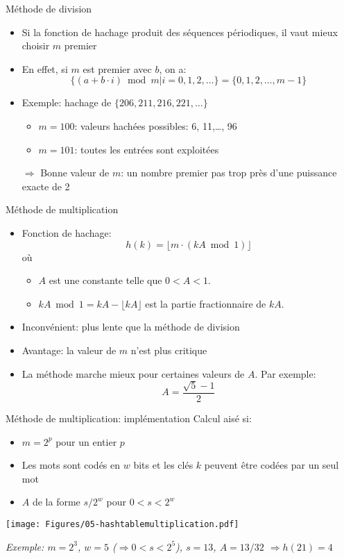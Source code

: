 \begin{frame}{Méthode de division}

\begin{itemize}
\item Si la fonction de hachage produit des séquences périodiques, il vaut mieux choisir $m$ premier
\item En effet, si $m$ est premier avec $b$, on a:
$$\{(a+b\cdot i) \bmod m|i=0,1,2,\ldots\}=\{0,1,2,\ldots,m-1\}$$
\item Exemple: hachage de $\{206, 211, 216, 221,\ldots\}$
\begin{itemize}
\item $m=100$: valeurs hachées possibles: 6, 11,\ldots, 96
\item $m=101$: toutes les entrées sont exploitées
\end{itemize}

\bigskip

\item[$\Rightarrow$] Bonne valeur de $m$: un nombre premier pas trop près d'une puissance exacte de 2
\end{itemize}
\end{frame}

\begin{frame}{Méthode de multiplication}
\begin{itemize}
\item Fonction de hachage:
$$h(k)=\lfloor m\cdot(k A \bmod 1)\rfloor$$
où
\begin{itemize}
\item $A$ est une constante telle que $0<A<1$.
\item $k A \bmod 1=k A - \lfloor k A \rfloor$ est la partie
  fractionnaire de $kA$.
\end{itemize}
\item Inconvénient: plus lente que la méthode de division
\item Avantage: la valeur de $m$ n'est plus critique
\item La méthode marche mieux pour certaines valeurs de $A$. Par
  exemple:$$A=\frac{\sqrt{5}-1}{2}$$
\end{itemize}
\end{frame}

\begin{frame}{Méthode de multiplication: implémentation}
Calcul aisé si:
\begin{itemize}
\item $m=2^p$ pour un entier $p$
\item Les mots sont codés en $w$ bits et les clés $k$ peuvent être
  codées par un seul mot
\item $A$ de la forme $s/2^w$ pour $0<s<2^w$
\end{itemize}

\centerline{\texttt{[image: Figures/05-hashtablemultiplication.pdf]}}

\bigskip

{\small\it Exemple: $m=2^3$, $w=5$ ($\Rightarrow 0<s<2^5$), $s=13$, $A=13/32$ $\Rightarrow h(21)=4$}
\end{frame}

